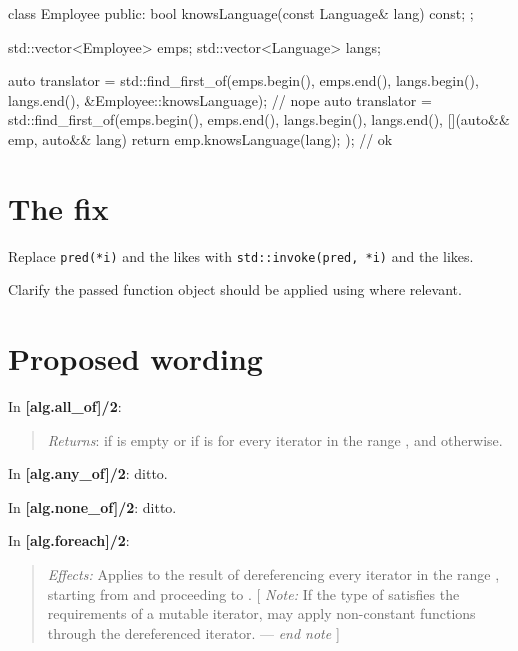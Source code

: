 \documentclass{wg21}
\newcommand{\cc}[1]{\texttt{#1}}
\begin{document}
\begin{cpp}
  class Employee
  {
  public:
      bool knowsLanguage(const Language& lang) const;
  };

  std::vector<Employee> emps;
  std::vector<Language> langs;

  auto translator = std::find_first_of(emps.begin(), emps.end(),
          langs.begin(), langs.end(),
          &Employee::knowsLanguage);                            // nope
  auto translator = std::find_first_of(emps.begin(), emps.end(),
          langs.begin(), langs.end(),
          [](auto&& emp, auto&& lang) { return emp.knowsLanguage(lang); });
                                                                // ok
\end{cpp}

\section{The fix}

Replace \cc{pred(*i)} and the likes with \cc{std::invoke(pred, *i)}
and the likes.

Clarify the passed function object should be applied using 
where relevant.

\section{Proposed wording}

In \textbf{[alg.all_of]/2}:
\begin{quote}
  \emph{Returns}:  if \tcode{[first, last)} is empty or if
    is
   for every iterator  in the range \tcode{[first, last)},
  and  otherwise.
\end{quote}

In \textbf{[alg.any_of]/2}: ditto.

In \textbf{[alg.none_of]/2}: ditto.

In \textbf{[alg.foreach]/2}:
\begin{quote}
  \emph{Effects:} Applies   to the
  result of dereferencing every iterator in the range \tcode{[first, last)},
  starting from  and proceeding to .
  [ \emph{Note:} If the type of  satisfies the requirements of a
  mutable iterator,  may apply non-constant functions through the
  dereferenced iterator. --- \emph{end note} ]
\end{quote}
\end{document}
